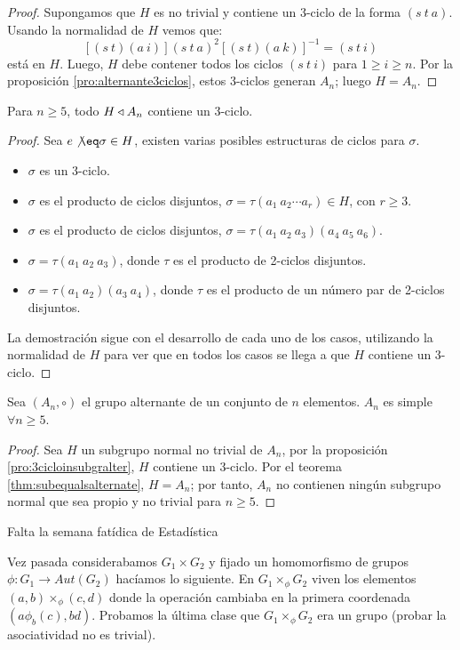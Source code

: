\begin{proof}
	Supongamos que $H$ es no trivial y contiene un 3-ciclo de la forma $(s\ t\ a)$. Usando la normalidad de $H$ vemos que:
	\[
		[(s\ t)(a\ i)](s\ t\ a)^2[(s\ t)(a\ k)]^{-1} = (s\ t\ i)
	\]
	está en $H$. Luego, $H$ debe contener todos los ciclos $(s\ t\ i)$ para $1 \geq i \geq n$. Por la proposición \ref{pro:alternante3ciclos}, estos 3-ciclos generan $A_n$; luego $H = A_n$.
\end{proof}
\begin{pro}
	\label{pro:3cicloinsubgralter}
	Para $n\geq 5$, todo $H \mathbin{\triangleleft} A_n$ contiene un 3-ciclo.
\end{pro}
\begin{proof}
	Sea $e \not \eq \sigma \in H$, existen varias posibles estructuras de ciclos para $\sigma$.
	\begin{itemize}
		\item $\sigma$ es un 3-ciclo.
		\item $\sigma$ es el producto de ciclos disjuntos, $\sigma = \tau(a_1\ a_2 \cdots a_r)\in H$, con $r\geq 3$.
		\item $\sigma$ es el producto de ciclos disjuntos, $\sigma = \tau(a_1\ a_2\ a_3)(a_4\ a_5\ a_6)$.
		\item $\sigma = \tau(a_1\ a_2\ a_3)$, donde $\tau$ es el producto de 2-ciclos disjuntos.
		\item $\sigma = \tau(a_1\ a_2)(a_3\ a_4)$, donde $\tau$ es el producto de un número par de 2-ciclos disjuntos.
	\end{itemize}
	La demostración sigue con el desarrollo de cada uno de los casos, utilizando la normalidad de $H$ para ver que en todos los casos se llega a que $H$ contiene un 3-ciclo.
\end{proof}
\begin{thm}
	Sea $(A_n, \circ)$ el grupo alternante de un conjunto de $n$ elementos. $A_n$ es simple $\forall n \geq 5$.
\end{thm}
\begin{proof}
	Sea $H$ un subgrupo normal no trivial de $A_n$, por la proposición \ref{pro:3cicloinsubgralter}, $H$ contiene un 3-ciclo. Por el teorema \ref{thm:subequalsalternate}, $H = A_n$; por tanto, $A_n$ no contienen ningún subgrupo normal que sea propio y no trivial para $n\geq 5$.
\end{proof}
Falta la semana fatídica de Estadística

Vez pasada considerabamos $G_1 \times G_2$ y fijado un homomorfismo de grupos $\phi: G_1 \to Aut(G_2)$ hacíamos lo siguiente. En $G_1 \times_{\phi} G_2$ viven los elementos $(a,b) \times_{\phi} (c,d)$ donde la operación cambiaba en la primera coordenada $(a \phi_b(c), bd)$. Probamos la última clase que $G_1 \times_{\phi} G_2$ era un grupo (probar la asociatividad no es trivial).

